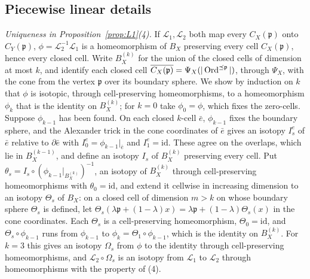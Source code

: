 \subsection{Piecewise linear details}\label{app:leg-pl}
\emph{Uniqueness in Proposition~\ref{prop:L1}(4).} If $\mathcal L_1,\mathcal L_2$ both map every $C_X({\mathfrak p})$ onto $C_Y({\mathfrak p})$, $\phi=\mathcal L_2^{-1}\mathcal L_1$ is a homeomorphism of $B_X$ preserving
every cell $C_X({\mathfrak p})$, hence every closed cell. Write $B_X^{(k)}$ for the union of the closed cells of dimension at most $k$,
and identify each closed cell $\overline{C_X({\mathfrak p})}=\Psi_X(|\operatorname{Ord}^{\preceq {\mathfrak p}}|)$, through $\Psi_X$, with the cone from the
vertex ${\mathfrak p}$ over its boundary sphere. We show by induction on $k$ that $\phi$ is isotopic, through cell-preserving
homeomorphisms, to a homeomorphism $\phi_k$ that is the identity on $B_X^{(k)}$; for $k=0$ take $\phi_0=\phi$, which fixes
the zero-cells. Suppose $\phi_{k-1}$ has been found. On each closed $k$-cell $\bar e$, $\phi_{k-1}$ fixes the boundary
sphere, and the Alexander trick \cite{Ale23} in the cone coordinates of $\bar e$ gives an isotopy $I^e_s$ of $\bar e$
relative to $\partial\bar e$ with $I^e_0=\phi_{k-1}|_{\bar e}$ and $I^e_1=\mathrm{id}$. These agree on the overlaps, which
lie in $B_X^{(k-1)}$, and define an isotopy $I_s$ of $B_X^{(k)}$ preserving every cell. Put
$\theta_s=I_s\circ(\phi_{k-1}|_{B_X^{(k)}})^{-1}$, an isotopy of $B_X^{(k)}$ through cell-preserving homeomorphisms with
$\theta_0=\mathrm{id}$, and extend it cellwise in increasing dimension to an isotopy $\Theta_s$ of $B_X$: on a closed cell
of dimension $m>k$ on whose boundary sphere $\Theta_s$ is defined, let $\Theta_s(\lambda {\mathfrak p}+(1-\lambda)x)=\lambda
{\mathfrak p}+(1-\lambda)\Theta_s(x)$ in the cone coordinates. Each $\Theta_s$ is a cell-preserving homeomorphism, $\Theta_0=\mathrm{id}$,
and $\Theta_s\circ\phi_{k-1}$ runs from $\phi_{k-1}$ to $\phi_k=\Theta_1\circ\phi_{k-1}$, which is the identity on
$B_X^{(k)}$. For $k=3$ this gives an isotopy $\Omega_s$ from $\phi$ to the identity through cell-preserving
homeomorphisms, and $\mathcal L_2\circ\Omega_s$ is an isotopy from $\mathcal L_1$ to $\mathcal L_2$ through homeomorphisms
with the property of (4).

